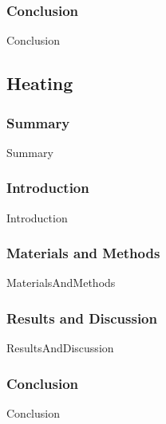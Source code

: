 \documentclass[12pt,a4paper]{article}
\begin{document}
    \subsubsection{Conclusion}
        {Conclusion}
        \pagebreak
        
        \subsection{Heating}
    \subsubsection{Summary}
        {Summary}
    \subsubsection{Introduction}
        {Introduction}
    \subsubsection{Materials and Methods}
        {MaterialsAndMethods}
    \subsubsection{Results and Discussion}
		{ResultsAndDiscussion}
    \subsubsection{Conclusion}
        {Conclusion}
\pagebreak
    
\end{document}
